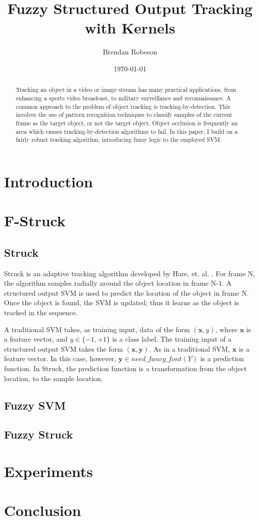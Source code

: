 \documentclass{IEEEtran}
\begin{document}
\title{Fuzzy Structured Output Tracking with Kernels}
\author{Brendan Robeson}
\date{\today}
\maketitle

\begin{abstract}
    Tracking an object in a video or image stream has many practical applications, from enhancing a
    sports video broadcast, to military surveillance and reconnaissance. A common approach to the
    problem of object tracking is tracking-by-detection. This involves the use of pattern
    recognition techniques to classify samples of the current frame as the target object, or not the
    target object. Object occlusion is frequently an area which causes tracking-by-detection
    algorithms to fail. In this paper, I build on a fairly robust tracking algorithm, introducing
    fuzzy logic to the employed SVM.
\end{abstract}

\section{Introduction}

\section{F-Struck}
\subsection{Struck}
Struck is an adaptive tracking algorithm developed by Hare, et. al. \cite{6126251}. For frame N, the
algorithm samples radially around the object location in frame N-1. A structured output SVM is used
to predict the location of the object in frame N. Once the object is found, the SVM is updated; thus
it learns as the object is tracked in the sequence.

A traditional SVM takes, as training input, data of the form \((\textbf{x}, y)\), where
\(\textbf{x}\) is a feature vector, and \(y \in \{-1, +1\}\) is a class label. The training input of
a structured output SVM takes the form \((\textbf{x}, \textbf{y})\). As in a traditional SVM,
\(\textbf{x}\) is a feature vector. In this case, however, \(\textbf{y} \in need\_fancy\_font(Y)\) is a prediction
function. In Struck, the prediction function is a transformation from the object location, to the
sample location.

\subsection{Fuzzy SVM}

\subsection{Fuzzy Struck}

\section{Experiments}

\section{Conclusion}

%
%
\end{document}
